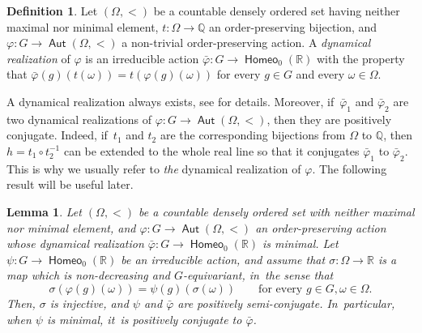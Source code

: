 \documentclass[JEP,XML,SOM,Unicode,NoFloatCountersInSection,published]{cedram}
\newtheorem{lem}[thm]{Lemma}
\theoremstyle{definition}
\newtheorem{dfn}[thm]{Definition}
\DeclareMathOperator{\Aut}{\mathsf{Aut}}
\DeclareMathOperator{\homeo}{\mathsf{Homeo}}
\newcommand{\R}{\mathbb{R}}
\newcommand{\Q}{\mathbb Q}
\begin{document}
\begin{dfn} \label{def dynamical realization}
Let $(\Omega,<)$ be a countable densely ordered set having neither maximal nor minimal element, $t\colon \Omega\to \Q$ an order-preserving bijection, and $\varphi\colon G\to \Aut(\Omega,<)$ a non-trivial order-preserving action. A \emph{dynamical realization} of $\varphi$ is an irreducible action $\bar\varphi\colon G\to \homeo_0(\R)$ with the property that
$\bar\varphi(g)(t(\omega))= t(\varphi(g)(\omega))$
for every $g\in G$ and every $\omega\in \Omega$.
\end{dfn}
A dynamical realization always exists, see \cite[\S 2.4]{ClayRolfsen} for details. Moreover, if~$\bar\varphi_1$ and $\bar\varphi_2$ are two dynamical realizations of $\varphi\colon G\to \Aut(\Omega,<)$, then they are positively conjugate. Indeed, if~$t_1$ and $t_2$ are the corresponding bijections from $\Omega$ to $\Q$, then $h=t_1\circ t_2^{-1}$ can be extended to the whole real line so that it conjugates $\bar\varphi_1$ to $\bar\varphi_2$. This is why we usually refer to \emph{the} dynamical realization of $\varphi$. The following result will be useful later.

\begin{lem} \label{l-dynamical-realisation}
Let $(\Omega,<)$ be a countable densely ordered set with neither maximal nor minimal element, and $\varphi\colon G\to \Aut(\Omega,<)$ an order-preserving action whose dynamical realization $\bar\varphi\colon G\to \homeo_0(\R)$ is minimal.
Let $\psi\colon G\to \homeo_0(\R)$ be an irreducible action, and assume that $\sigma\colon \Omega\to \R$ is a map which is non-decreasing and $G$-equivariant, in~the sense that
\[ \sigma (\varphi(g)(\omega))=\psi(g)(\sigma(\omega)) \quad \quad \text{for every }g\in G, \omega\in \Omega.
\]
Then, $\sigma$ is injective, and $\psi$ and $\bar{\varphi}$ are positively semi-conjugate. In~particular, when $\psi$ is minimal, it~is positively conjugate to $\bar{\varphi}$.
\end{lem}
\end{document}

